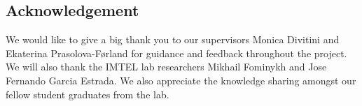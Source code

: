 \setcounter{page}{1}

\pagestyle{fancy}
\fancyhf{}
\renewcommand{\chaptermark}[1]{\markboth{\chaptername\ \thechapter.\ #1}{}}
\renewcommand{\sectionmark}[1]{\markright{\thesection\ #1}}
\renewcommand{\headrulewidth}{0.1ex}
\renewcommand{\footrulewidth}{0.1ex}
\fancyfoot[LE,RO]{\thepage}
\fancypagestyle{plain}{\fancyhf{}\fancyfoot[LE,RO]{\thepage}\renewcommand{\headrulewidth}{0ex}}


\vspace*{1mm}

\begin{center}
\section*{\Huge Acknowledgement}
\vspace*{0.7cm}
\end{center}

\noindent We would like to give a big thank you to our supervisors Monica Divitini and Ekaterina Prasolova-Førland for guidance and feedback throughout the project. We will also thank the IMTEL lab researchers Mikhail Fominykh and Jose Fernando Garcia Estrada. We also appreciate the knowledge sharing amongst our fellow student graduates from the lab.  


\vspace*{0.7cm}
\begin{flushright}
\myauthor
\end{flushright}

\cleardoublepage